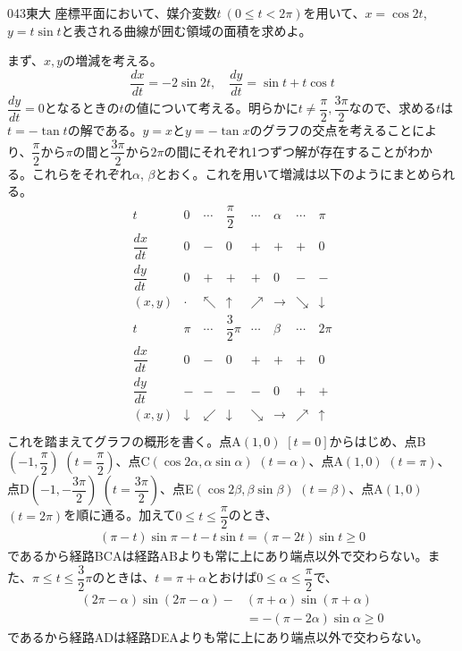 \begin{prob}{043}{\maru}{東大}
 座標平面において、媒介変数$t~(0\le t< 2\pi)$を用いて、$x=\cos2t$, $y=t\sin t$と表される曲線が囲む領域の面積を求めよ。
\end{prob}

まず、$x, y$の増減を考える。
\[ \frac{dx}{dt}=-2\sin 2t, \quad  \frac{dy}{dt}=\sin t+t\cos t \]
$\dfrac{dy}{dt}=0$となるときの$t$の値について考える。明らかに$t\neq \dfrac{\pi}{2}, \dfrac{3\pi}{2}$なので、求める$t$は$t=-\tan t$の解である。$y=x$と$y=-\tan x$のグラフの交点を考えることにより、$\dfrac{\pi}{2}$から$\pi$の間と$\dfrac{3\pi}{2}$から$2\pi$の間にそれぞれ1つずつ解が存在することがわかる。これらをそれぞれ$\alpha$, $\beta$とおく。これを用いて増減は以下のようにまとめられる。
\begin{align*}
\begin{array}{c|c|c|c|c|c|c|c}
 t & 0 & \cdots & \dfrac{\pi}{2} & \cdots & \alpha & \cdots & \pi \\[1.0ex] \hline
 \dfrac{dx}{dt} & 0 & - & 0 & + & + & + & 0 \\[1.0ex] \hline
 \dfrac{dy}{dt} & 0 & + & + & + & 0 & - & - \\[1.0ex] \hline
 (x, y) & \cdot & \nwarrow & \uparrow & \nearrow & \to & \searrow & \downarrow \\ \hline\hline
 t & \pi & \cdots & \dfrac{3}{2}\pi & \cdots & \beta & \cdots & 2\pi \\[1.0ex] \hline
 \dfrac{dx}{dt} & 0 & - & 0 & + & + & + & 0 \\[1.0ex] \hline
 \dfrac{dy}{dt} & - & - & - & - & 0 & + & + \\[1.0ex] \hline
 (x, y) & \downarrow & \swarrow & \downarrow & \searrow & \to & \nearrow & \uparrow \\
 \end{array}
\end{align*}
これを踏まえてグラフの概形を書く。点A$(1, 0)$ $[t=0]$からはじめ、点B$\left(-1, \dfrac{\pi}{2}\right)$ $\left(t=\dfrac{\pi}{2}\right)$、点C$(\cos2\alpha, \alpha\sin\alpha)$ $(t=\alpha)$、点A$(1, 0)$ $(t=\pi)$、点D$\left(-1, -\dfrac{3\pi}{2}\right)$ $\left(t=\dfrac{3\pi}{2}\right)$、点E$(\cos2\beta, \beta\sin\beta)$ $(t=\beta)$、点A$(1, 0)$ $(t=2\pi)$を順に通る。加えて$0\le t \le \dfrac{\pi}{2}$のとき、
\begin{align*}
 (\pi-t)\sin{\pi-t}-t\sin t=(\pi-2t)\sin t \ge 0
\end{align*}
であるから経路BCAは経路ABよりも常に上にあり端点以外で交わらない。また、$\pi\le t\le \dfrac{3}{2}\pi$のときは、$t=\pi+\alpha$とおけば$0\le\alpha\le\dfrac{\pi}{2}$で、
\begin{align*}
 (2\pi-\alpha)\sin(2\pi-\alpha)-&(\pi+\alpha)\sin(\pi+\alpha) \\
 &=-(\pi-2\alpha)\sin\alpha \ge 0
\end{align*}
であるから経路ADは経路DEAよりも常に上にあり端点以外で交わらない。

